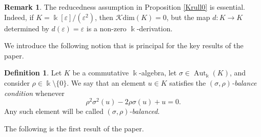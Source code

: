 \documentclass{amsart}
\theoremstyle{definition}
\newtheorem{definition}[theorem]{Definition}
\newtheorem{remark}[theorem]{Remark}
\theoremstyle{remark}
\numberwithin{equation}{section}
\begin{document}
\begin{remark}\label{whyred}
The reducedness assumption in Proposition \ref{Krull0} is essential. Indeed, if $K=\Bbbk[\varepsilon]/(\varepsilon^2)$, then $\mathcal{K}\mathrm{dim}(K)=0$, but the map $d:K\to K$ determined by $d(\varepsilon)=\varepsilon$ is a non-zero $\Bbbk$-derivation.
\end{remark}

We introduce the following notion that is principal for the key results of the paper.

\begin{definition}\label{sigmarhobal}
Let $K$ be a commutative $\Bbbk$-algebra, let $\sigma\in \operatorname{Aut}_{\Bbbk}(K)$, and consider $\rho\in \Bbbk\setminus\{0\}$. We say that an element $u\in K$ satisfies the \emph{$(\sigma,\rho)$-balance condition} whenever
\[
\rho^2\sigma^2(u)-2\rho\sigma(u)+u=0.
\]
Any such element will be called \emph{$(\sigma,\rho)$-balanced}.
\end{definition}

The following is the first result of the paper.
\end{document}
